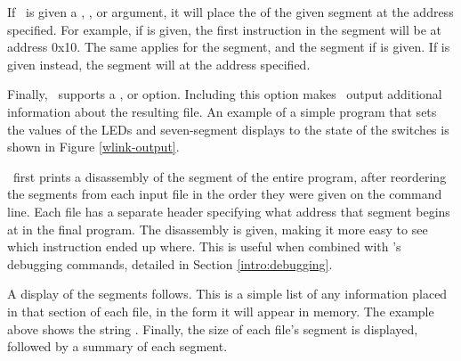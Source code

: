 If \wlink\ is given a , , or  argument, 
it will place the  of the given segment at the address specified. For
example, if  is given, the first instruction in the
 segment will be at address 0x10. The same applies for the
 segment, and the  segment if  is given. If
 is given instead, the  segment will  at the
address specified.

Finally, \wlink\ supports a , or  option. Including this
option makes \wlink\ output additional information about the resulting
 file. An example of a simple program that sets the values
of the LEDs and seven-segment displays to the state of the switches is shown
in Figure \ref{wlink-output}.

\wlink\ first prints a disassembly of the  segment of the entire
program, after reordering the  segments from each input file in the
order they were given on the command line. Each file has a separate header
specifying what address that segment begins at in the final program. The
disassembly is given, making it more easy to see which instruction ended up
where. This is useful when combined with \WRAMPmon's debugging commands,
detailed in Section \ref{intro:debugging}.

A display of the  segments follows. This is a simple list of any
information placed in that section of each file, in the form it will appear
in memory. The example above shows the string . Finally, the
size of each file's  segment is displayed, followed by a summary
of each segment.

